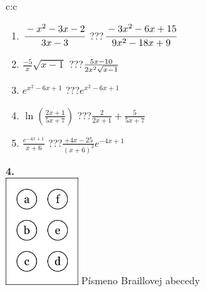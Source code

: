 \documentclass[10pt]{report}
\begin{document}
\begin{tabular}{c:c}
\begin{minipage}[c][104.5mm][t]{0.5\linewidth}
\begin{center}
\begin{minipage}{0.79\linewidth}
\begin{center}
\begin{varwidth}{\linewidth}
\begin{enumerate}
\item $\cfrac{-x^2-3x-2}{3x-3}$\quad \dotfill\; ???\;\dotfill \quad $\cfrac{-3x^2-6x+15}{9x^2-18x+9}$
\item $\frac{-5}{x}\sqrt{x-1}$\quad \dotfill\; ???\;\dotfill \quad $\frac{5x-10}{2x^2 \sqrt{\smash[b]{x-1}}}$
\item $e^{x^2-6x+1}$\quad \dotfill\; ???\;\dotfill \quad $e^{x^2-6x+1}$
\item $\ln{\left(\frac{2x+1}{5x+7}\right)}$\quad \dotfill\; ???\;\dotfill \quad $\frac{2}{2x+1}+\frac{5}{5x+7}$
\item $\frac{e^{-4x+1}}{x+6}$\quad \dotfill\; ???\;\dotfill \quad $\frac{+4x-25}{(x+6)^2}e^{-4x+1}$
\end{enumerate}
\end{varwidth}
\end{center}
\end{minipage}
\begin{minipage}{0.20\linewidth}
\begin{center}
{\Huge\bfseries 4.} \\[2mm]
\includegraphics[height=40mm]{../images/braille.png}
{\small Písmeno Braillovej abecedy}
\end{center}
\end{minipage}
\end{center}
\end{minipage}
%
\end{tabular}
\newpage
\thispagestyle{empty}
\end{document}
